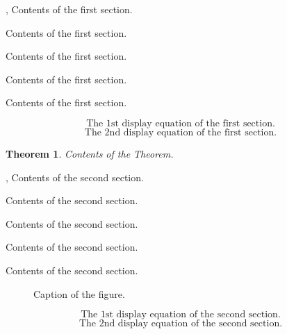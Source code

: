 \documentclass[10pt]{book}
\newtheorem{theorem}{Theorem}
\theoremstyle{definition}
\begin{document}
\fontsize{10.95}{14pt plus.8pt minus .6pt}\selectfont

\setcounter{chapter}{1}
\setcounter{equation}{0} %

\cite{1},
Contents of the first section.

Contents of the first section.

Contents of the first section.

Contents of the first section.

Contents of the first section.
\par

\begin{equation}\label{1.1}
\mbox {The 1st display equation of the first section.}
\end{equation}
\begin{equation}\label{1.2}
\mbox {The 2nd display equation of the first section.}
\end{equation}

\begin{theorem}
Contents of the Theorem.
\end{theorem}


\setcounter{chapter}{2}
\setcounter{equation}{0} %

\cite{2},
Contents of the second section.

Contents of the second section.

Contents of the second section.

Contents of the second section.

Contents of the second section.
\begin{figure}[h!]
\centerline{}\par

\caption{Caption of the figure.}
\end{figure}

\begin{equation}\label{2.1}
\mbox {The 1st display equation of the second section.}
\end{equation}
\begin{equation}\label{2.2}
\mbox {The 2nd display equation of the second section.}
\end{equation}
\end{document}
